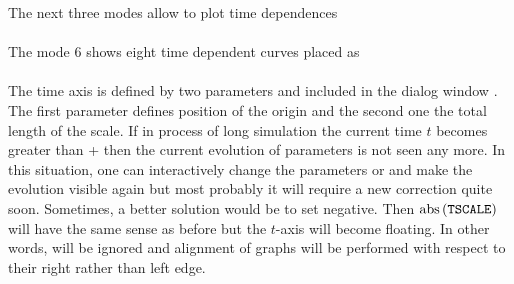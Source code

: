 The next three modes allow to plot time dependences
\bigskip\\
\\[2ex]
The mode 6 shows eight time dependent curves placed as
\bigskip\\
\\[2ex]
The time axis is defined by two parameters  and 
included in the dialog window .
The first parameter defines position of the origin and the second one
the total length of the scale.
If in process of long simulation the current time $t$ becomes greater
than + then the current evolution of parameters
is not seen any more.
In this situation, one can interactively change the parameters
 or  and make the evolution visible again but
most probably it will require a new correction quite soon.
Sometimes, a better solution would be to set  negative.
Then $\rm abs\,({\tt TSCALE})$ will have the same sense as before but 
the $t$-axis will become floating.
In other words,  will be ignored and alignment of graphs will
be performed with respect to their right rather than left edge.

